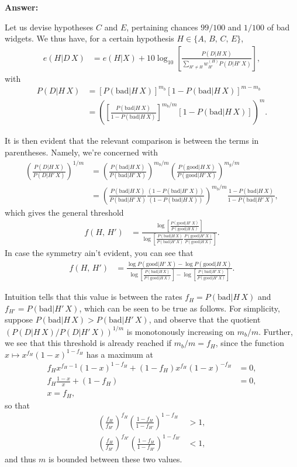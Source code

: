 \documentclass{article}
\begin{document}
\textbf{Answer:}

Let us devise hypotheses $C$ and $E$, pertaining chances $99/100$ and $1/100$ of bad widgets. We thus have, for a certain hypothesis $H\in\{A,\,B,\,C,\,E\}$,
\begin{align*}
	e(H|D\,X)&=e(H|X)+10\log_{10}\left[\frac{P(D|H\,X)}{\sum_{H'\neq H}w_{H'}^{(H)}P(D|H'\,X)}\right],
\end{align*}
with
\begin{align*}
	P(D|H\,X)&=\left[P(\text{bad}|H\,X)\right]^{m_b}\left[1-P(\text{bad}|H\,X)\right]^{m-m_b}\\
		 &=\left(\left[\frac{P(\text{bad}|H\,X)}{1-P(\text{bad}|H\,X)}\right]^{m_b/m}\left[1-P(\text{bad}|H\,X)\right]\right)^m.
\end{align*}

It is then evident that the relevant comparison is between the terms in parentheses. Namely, we're concerned with
\begin{align*}
	\left(\frac{P(D|H\,X)}{P(D|H'\,X)}\right)^{1/m}&=\left(\frac{P(\text{bad}|H\,X)}{P(\text{bad}|H'\,X)}\right)^{m_b/m}\left(\frac{P(\text{good}|H\,X)}{P(\text{good}|H'\,X)}\right)^{m_g/m}\\
	&=\left(\frac{P(\text{bad}|H\,X)}{P(\text{bad}|H'\,X)}\frac{(1-P(\text{bad}|H'\,X))}{(1-P(\text{bad}|H\,X))}\right)^{m_b/m}\frac{1-P(\text{bad}|H\,X)}{1-P(\text{bad}|H'\,X)},
\end{align*}
which gives the general threshold
\begin{align*}
	f(H,\,H')&=\frac{\log\left[\frac{P(\text{good}|H'\,X)}{P(\text{good}|H\,X)}\right]}{\log\left[\frac{P(\text{bad}|H\,X)}{P(\text{bad}|H'\,X)}\frac{P(\text{good}|H'\,X)}{P(\text{good}|H\,X)}\right]}.
\end{align*}
In case the symmetry ain't evident, you can see that
\begin{align*}
	f(H,\,H')&=\frac{\log P(\text{good}|H'\,X)-\log P(\text{good}|H\,X)}{\log\left[\frac{P(\text{bad}|H\,X)}{P(\text{good}|H\,X)}\right]-\log\left[\frac{P(\text{bad}|H'\,X)}{P(\text{good}|H'\,X)}\right]}.
\end{align*}

Intuition tells that this value is between the rates $f_H=P(\text{bad}|H\,X)$ and $f_{H'}=P(\text{bad}|H'\,X)$, which can be seen to be true as follows. For simplicity, suppose $P(\text{bad}|H\,X)>P(\text{bad}|H'\,X)$, and observe that the quotient $\left(P(D|H\,X)/P(D|H'\,X)\right)^{1/m}$ is monotonously increasing on $m_b/m$. Further, we see that this threshold is already reached if $m_b/m=f_H$, since the function $x\mapsto x^{f_H}(1-x)^{1-f_H}$ has a maximum at
\begin{align*}
	f_Hx^{f_H-1}(1-x)^{1-f_H}+(1-f_H)x^{f_H}(1-x)^{-f_H}&=0,\\
	f_H\frac{1-x}{x}+(1-f_H)&=0,\\
	x=f_H,
\end{align*}
so that
\begin{align*}
	\left(\frac{f_H}{f_{H'}}\right)^{f_H}\left(\frac{1-f_H}{1-f_{H'}}\right)^{1-f_H}&>1,\\
	\left(\frac{f_H}{f_{H'}}\right)^{f_{H'}}\left(\frac{1-f_H}{1-f_{H'}}\right)^{1-f_{H'}}&<1,
\end{align*}
and thus $m$ is bounded between these two values.
\end{document}
